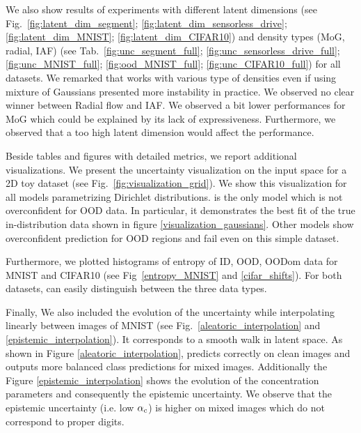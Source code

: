 We also show results of experiments with different latent dimensions (see Fig.~\ref{fig:latent_dim_segment}; \ref{fig:latent_dim_sensorless_drive}; \ref{fig:latent_dim_MNIST}; \ref{fig:latent_dim_CIFAR10}) and density types (MoG, radial, IAF) (see Tab.~\ref{fig:unc_segment_full}; \ref{fig:unc_sensorless_drive_full}; \ref{fig:unc_MNIST_full}; \ref{fig:ood_MNIST_full}; \ref{fig:unc_CIFAR10_full}) for all datasets. We remarked that \PostNetacro works with various type of densities even if using mixture of Gaussians presented more instability in practice. We observed no clear winner between Radial flow and IAF. We observed a bit lower performances for MoG which could be explained by its lack of expressiveness. Furthermore, we observed that a too high latent dimension would affect the performance.

Beside tables and figures with detailed metrics, we report additional visualizations. We present the uncertainty visualization on the input space for a 2D toy dataset (see Fig.~\ref{fig:visualization_grid}). We show this visualization for all models parametrizing Dirichlet distributions. \PostNetacro is the only model which is not overconfident for OOD data. In particular, it demonstrates the best fit of the true in-distribution data shown in figure \ref{visualization_gaussians}. Other models show overconfident prediction for OOD regions and fail even on this simple dataset. 

Furthermore, we plotted histograms of entropy of ID, OOD, OODom data for MNIST and CIFAR10 (see Fig~\ref{entropy_MNIST} and \ref{cifar_shifts}). For both datasets, \PostNetacro can easily distinguish between the three data types.

Finally, We also included the evolution of the uncertainty while interpolating linearly between images of MNIST (see Fig.~\ref{aleatoric_interpolation} and \ref{epistemic_interpolation}). It corresponds to a smooth walk in latent space. As shown in Figure \ref{aleatoric_interpolation}, \PostNetacro predicts correctly on clean images and outputs more balanced class predictions for mixed images. Additionally the Figure \ref{epistemic_interpolation} shows the evolution of the concentration parameters and consequently the epistemic uncertainty. We observe that the epistemic uncertainty (i.e. low $\alpha_c$) is higher on mixed images which do not correspond to proper digits.


